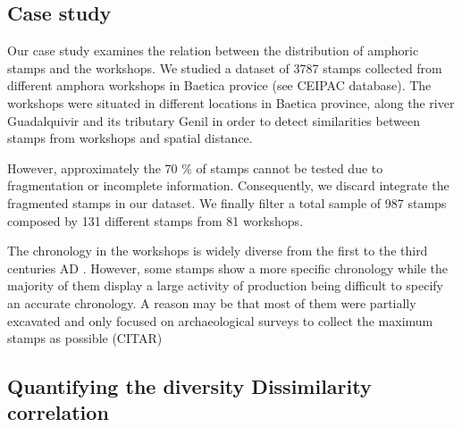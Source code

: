 \documentclass[review]{elsarticle}
\begin{document}
\subsection{Case study}

Our case study examines the relation between the distribution of amphoric stamps and the workshops. We studied a dataset of 3787 stamps collected from different amphora workshops in Baetica provice (see CEIPAC database). The workshops were situated in different locations in Baetica province, along the river Guadalquivir and its tributary Genil in order to detect similarities between stamps from workshops and spatial distance. 

However, approximately the 70 \% of stamps cannot be tested due to fragmentation or incomplete information. Consequently, we discard integrate the fragmented stamps in our dataset. We finally filter a total sample of 987 stamps composed by 131 different stamps from 81 workshops. 

The chronology in the workshops is widely diverse from the first to the third centuries AD \citep{garcia_vargas_enrique_formal_2010}. However, some stamps show a more specific chronology while the majority of them display a large activity of production being difficult to specify an accurate chronology. A reason may be that most of them were partially excavated and only focused on archaeological surveys to collect the maximum stamps as possible (CITAR) 



\subsection{Quantifying the diversity Dissimilarity correlation}
\end{document}
